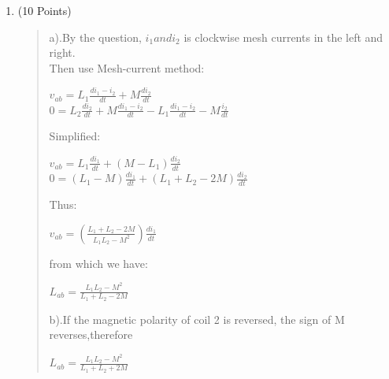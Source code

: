 \documentclass[12pt,a4paper]{article}
\begin{document}
\begin{enumerate}
		\item (10 Points)
		\begin{quote}
		a).By the question, $i_1 and i_2$ is clockwise mesh currents in the left and right.\\
		Then use Mesh-current method:
		\begin{center}
			$v_{ab} = L_1\frac{di_1-i_2}{dt}+M\frac{di_2}{dt}$\\
			$0=L_2\frac{di_2}{dt}+M\frac{di_1-i_2}{dt}-L_1\frac{di_1-i_2}{dt}-M\frac{i_2}{dt}$
		\end{center}
		Simplified:
		\begin{center}
		    $v_{ab}=L_1\frac{di_1}{dt}+(M-L_1)\frac{di_2}{dt}$\\
		    $0=(L_1-M)\frac{di_1}{dt}+(L_1+L_2-2M)\frac{di_2}{dt}$
		\end{center}
		Thus:
		\begin{center}
			$v_{ab}=(\frac{L_1+L_2-2M}{L_1L_2-M^2})\frac{di_1}{dt}$
		\end{center}
		from which we have:
		\begin{center}
			$L_{ab}=\frac{L_1L_2-M^2}{L_1+L_2-2M}$
		\end{center}
		b).If the magnetic polarity of coil 2 is reversed, the sign of M reverses,therefore
		\begin{center}
			$L_{ab}=\frac{L_1L_2-M^2}{L_1+L_2+2M}$
		\end{center}
		\end{quote}
		\clearpage
		

\end{enumerate}
\end{document}
